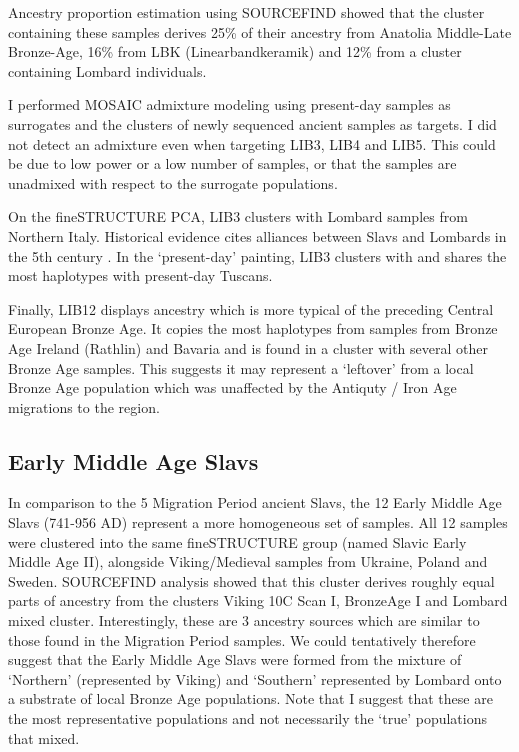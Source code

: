 Ancestry proportion estimation using SOURCEFIND showed that the cluster containing these samples derives 25\% of their ancestry from Anatolia Middle-Late Bronze-Age, 16\% from LBK (Linearbandkeramik) and 12\% from a cluster containing Lombard individuals. 

I performed MOSAIC admixture modeling using present-day samples as surrogates and the clusters of newly sequenced ancient samples as targets. I did not detect an admixture even when targeting LIB3, LIB4 and LIB5. This could be due to low power or a low number of samples, or that the samples are unadmixed with respect to the surrogate populations.

On the fineSTRUCTURE PCA, LIB3 clusters with Lombard samples from Northern Italy. Historical evidence cites alliances between Slavs and Lombards in the 5th century \cite{lotter2003volkerverschiebungen}. In the `present-day' painting, LIB3 clusters with and shares the most haplotypes with present-day Tuscans.  

Finally, LIB12 displays ancestry which is more typical of the preceding Central European Bronze Age. It copies the most haplotypes from samples from Bronze Age Ireland (Rathlin) and Bavaria and is found in a cluster with several other Bronze Age samples. This suggests it may represent a `leftover' from a local Bronze Age population which was unaffected by the Antiquty / Iron Age migrations to the region.

\subsection{Early Middle Age Slavs}

In comparison to the 5 Migration Period ancient Slavs, the 12 Early Middle Age Slavs (741-956 AD) represent a more homogeneous set of samples. All 12 samples were clustered into the same fineSTRUCTURE group (named Slavic Early Middle Age II), alongside Viking/Medieval samples from Ukraine, Poland and Sweden. SOURCEFIND analysis showed that this cluster derives roughly equal parts of ancestry from the clusters  Viking 10C Scan I, BronzeAge I and Lombard mixed cluster. Interestingly, these are 3 ancestry sources which are similar to those found in the Migration Period samples. We could tentatively therefore suggest that the Early Middle Age Slavs were formed from the mixture of `Northern' (represented by Viking) and `Southern' represented by Lombard onto a substrate of local Bronze Age populations. Note that I suggest that these are the most representative populations and not necessarily the `true' populations that mixed.

